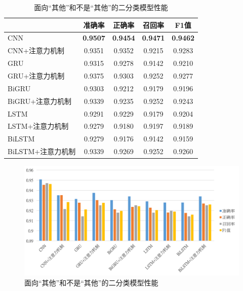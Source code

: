\begin{table}[htb]
  \centering
  \begin{minipage}[t]{0.8\linewidth}
  \caption{面向“其他”和不是“其他”的二分类模型性能}
  \label{tab:exp_context_emo_tri_result}
    \begin{tabularx}{\linewidth}{X|cccc}
    \toprule[1.5pt]
    & 准确率 & 正确率 & 召回率 & F1值 \\
    \hline
    CNN & \bf 0.9507 & \bf 0.9454 & \bf 0.9471 & \bf 0.9462 \\ %
    CNN+注意力机制 & 0.9351 & 0.9352 & 0.9215 & 0.9283 \\ %
    \hline
    GRU & 0.9315 & 0.9278 & 0.9142 & 0.9210 \\ %
    GRU+注意力机制 & 0.9375 & 0.9303 & 0.9252 & 0.9277 \\ %
    \hline
    BiGRU & 0.9303 & 0.9212 & 0.9179 & 0.9196 \\ %
    BiGRU+注意力机制 & 0.9339 & 0.9235 & 0.9252 & 0.9243 \\ %
    \hline
    LSTM & 0.9291 & 0.9229 & 0.9179 & 0.9204 \\ %
    LSTM+注意力机制 & 0.9279 & 0.9180 & 0.9197 & 0.9189 \\ %
    \hline
    BiLSTM & 0.9279 & 0.9176 & 0.9142 & 0.9159 \\ %
    BiLSTM+注意力机制 & 0.9339 & 0.9269 & 0.9252 & 0.9260 \\ %
    \bottomrule[1.5pt]
    \end{tabularx}
  \end{minipage}
\end{table}

\begin{figure}[H]
  \centering
  \includegraphics[width=\textwidth]{img/exp_context_emo_tri_result_bar.png}
  \caption{面向“其他”和不是“其他”的二分类模型性能}
  \label{fig:exp_context_emo_tri_result_bar}
\end{figure}

